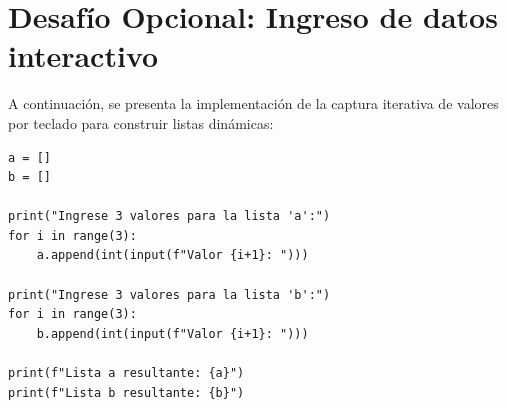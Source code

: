 \documentclass[11pt]{article}
\begin{document}
\section{Desafío Opcional: Ingreso de datos interactivo}

A continuación, se presenta la implementación de la captura iterativa de valores por teclado para construir listas dinámicas:

\begin{verbatim}
a = []
b = []

print("Ingrese 3 valores para la lista 'a':")
for i in range(3):
    a.append(int(input(f"Valor {i+1}: ")))

print("Ingrese 3 valores para la lista 'b':")
for i in range(3):
    b.append(int(input(f"Valor {i+1}: ")))

print(f"Lista a resultante: {a}")
print(f"Lista b resultante: {b}")
\end{verbatim}
\end{document}
